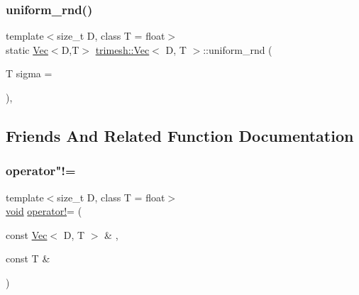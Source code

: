 \mbox{\label{classtrimesh_1_1Vec_a3fe9704a243014c011b439aa9009f6cf}} 
\subsubsection{\texorpdfstring{uniform\+\_\+rnd()}{uniform\_rnd()}}
{\footnotesize\ttfamily template$<$size\+\_\+t D, class T = float$>$ \\
static \hyperlink{classtrimesh_1_1Vec}{Vec}$<$D,T$>$ \hyperlink{classtrimesh_1_1Vec}{trimesh\+::\+Vec}$<$ D, T $>$\+::uniform\+\_\+rnd (\begin{DoxyParamCaption}\item[{T}]{sigma = {} }\end{DoxyParamCaption})\hspace{0.3cm}{\ttfamily [inline]}, {\ttfamily [static]}}



\subsection{Friends And Related Function Documentation}
\mbox{\label{classtrimesh_1_1Vec_ab3d8d3e2b3719cc9a73f7495bd527e21}} 
\subsubsection{\texorpdfstring{operator"!=}{operator!=}\hspace{0.1cm}{\footnotesize\ttfamily [1/2]}}
{\footnotesize\ttfamily template$<$size\+\_\+t D, class T = float$>$ \\
\hyperlink{namespacetrimesh_a784ddfd979e1c579bda795a8edfc3f43}{void} \hyperlink{namespacetrimesh_af767195cb37f08a930059365eb736329}{operator!}= (\begin{DoxyParamCaption}\item[{const \hyperlink{classtrimesh_1_1Vec}{Vec}$<$ D, T $>$ \&}]{,  }\item[{const T \&}]{ }\end{DoxyParamCaption})\hspace{0.3cm}{\ttfamily [friend]}}

